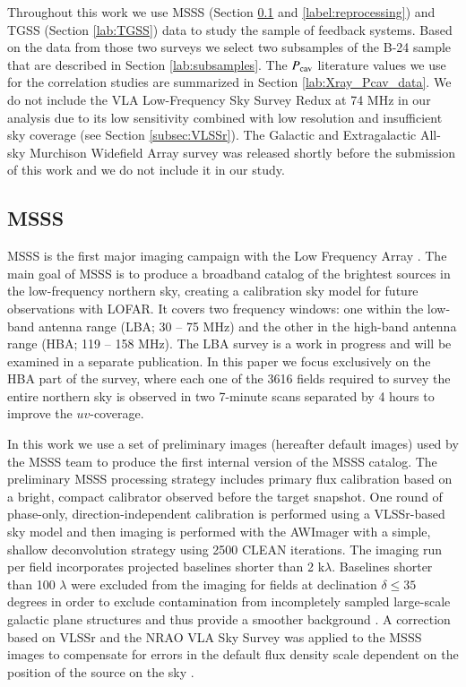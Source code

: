\documentclass{aa}  %
\begin{document}
Throughout this work we use MSSS (Section \ref{subsec:MSSS} and \ref{label:reprocessing}) and TGSS (Section \ref{lab:TGSS}) data to study the sample of feedback systems. 
Based on the data from those two surveys we select two subsamples of the B-24 sample that are described in Section \ref{lab:subsamples}.
The $P_{\rm cav}$ literature values we use for the correlation studies are summarized in Section \ref{lab:Xray_Pcav_data}.
We do not include the VLA Low-Frequency Sky Survey Redux at 74 MHz \citep[VLSSr;][]{Cohen2007, Lane2012, Lane2014} in our analysis due to its low sensitivity combined with low resolution and insufficient sky coverage (see Section \ref{subsec:VLSSr}).
The Galactic and Extragalactic All-sky Murchison Widefield Array survey \citep[GLEAM;][]{Wayth2015, Hurley-Walker2017} was released shortly before the submission of this work and we do not include it in our study.







\subsection{MSSS}
\label{subsec:MSSS}


MSSS is the first major imaging campaign with the Low Frequency Array \citep[LOFAR;][]{vanhaarlem2013}.
The main goal of MSSS is to produce a broadband catalog of the brightest sources in the low-frequency northern sky, creating a calibration sky model for future observations with LOFAR.
It covers two frequency windows: one within the low-band antenna range (LBA; 30 – 75 MHz) and the other in the high-band antenna range (HBA; 119 – 158 MHz).
The LBA survey is a work in progress and will be examined in a separate publication.
In this paper we focus exclusively on the HBA part of the survey, 
where each one of the 3616 fields required to survey the entire northern sky is observed in two 7-minute scans separated by 4 hours to improve the $uv$-coverage.

In this work we use a set of preliminary images (hereafter default images) used by the MSSS team to produce the first internal version of the MSSS catalog.
The preliminary MSSS processing strategy includes primary flux calibration based on a bright, compact calibrator observed before the target snapshot. One round of phase-only, direction-independent calibration is performed using a VLSSr-based sky model \citep{Heald2015} and then imaging is performed with the AWImager \citep{Tasse2013} with a simple, shallow deconvolution strategy using 2500 CLEAN iterations. 
The imaging run per field incorporates projected baselines shorter than 2 k$\lambda$. 
Baselines shorter than 100 $\lambda$ were excluded from the imaging for fields at declination $\delta \leq 35$ degrees in order to exclude contamination from incompletely sampled large-scale galactic plane structures and thus provide a smoother background \citep[see][]{Heald2015}.
A correction based on VLSSr and the NRAO VLA Sky Survey \citep[NVSS;][]{Condon1998} was applied to the MSSS images to compensate for errors in the default flux density scale dependent on the position of the source on the sky \citep{Hardcastle2016}.
\end{document}
